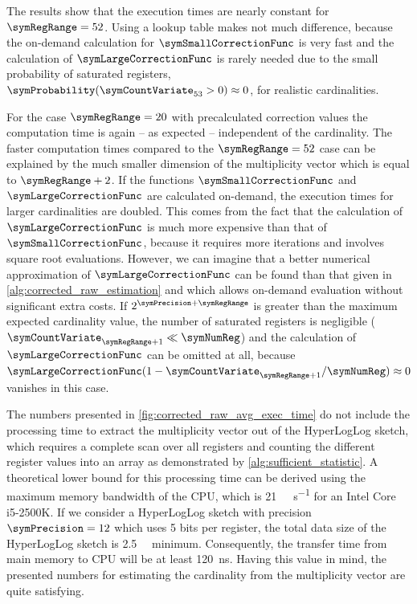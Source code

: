 \documentclass[a4paper]{scrartcl}
\begin{document}
The results show that the execution times are nearly constant for $\symRegRange=52$. Using a lookup table makes not much difference, because the on-demand calculation for  $\symSmallCorrectionFunc$ is very fast and the calculation of $\symLargeCorrectionFunc$ is rarely needed due to the small probability of saturated registers, $\symProbability(\symCountVariate_{53}>0)\approx 0$, for realistic cardinalities.

For the case $\symRegRange=20$ with precalculated correction values the computation time is again -- as expected -- independent of the cardinality. The faster computation times compared to the $\symRegRange=52$ case can be explained by the much smaller dimension of the multiplicity vector which is equal to $\symRegRange+2$. If the functions $\symSmallCorrectionFunc$ and $\symLargeCorrectionFunc$ are calculated on-demand, the execution times for larger cardinalities are doubled. This comes from the fact that the calculation of $\symLargeCorrectionFunc$ is much more expensive than that of $\symSmallCorrectionFunc$, because it requires more iterations and involves square root evaluations. However, we can imagine that a better numerical approximation of $\symLargeCorrectionFunc$ can be found than that given in \cref{alg:corrected_raw_estimation} and which allows on-demand evaluation without significant extra costs. If $2^{\symPrecision+\symRegRange}$ is greater than the maximum expected cardinality value, the number of saturated registers is negligible ($\symCountVariate_{\symRegRange+1}\ll \symNumReg$) and the calculation of $\symLargeCorrectionFunc$ can be omitted at all, because $\symLargeCorrectionFunc(1 - \symCountVariate_{\symRegRange+1}/\symNumReg) \approx 0$ vanishes in this case.

The numbers presented in \cref{fig:corrected_raw_avg_exec_time} do not include the processing time to extract the multiplicity vector out of the HyperLogLog sketch, which requires a complete scan over all registers and counting the different register values into an array as demonstrated by \cref{alg:sufficient_statistic}. A theoretical lower bound for this processing time can be derived using the maximum memory bandwidth of the CPU, which is \SI[per-mode=symbol]{21}{\giga\byte\per\second} for an Intel Core i5-2500K. If we consider a HyperLogLog sketch with precision $\symPrecision=12$ which uses 5 bits per register, the total data size of the HyperLogLog sketch is \SI{2.5}{\kilo\byte} minimum. Consequently, the transfer time from main memory to CPU will be at least \SI{120}{\nano\second}. Having this value in mind, the presented numbers for estimating the cardinality from the multiplicity vector are quite satisfying. 
\end{document}
